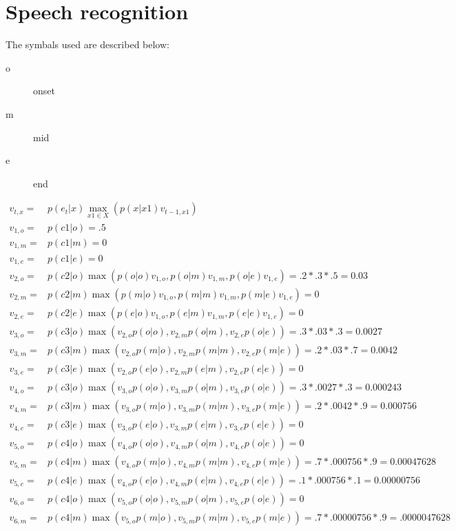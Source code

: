 \documentclass[12pt]{article}
\begin{document}
\section{Speech recognition}
The symbals used are described below:
\begin{description}
  \item[o] onset
  \item[m] mid
  \item[e] end
\end{description}
\begin{align*}
v_{t,x} =& p(e_t|x) \max_{x1 \in X} (p(x|x1) v_{t-1,x1})\\
v_{1,o} =& p(c1|o) = .5\\
v_{1,m} =& p(c1|m) = 0\\
v_{1,e} =& p(c1|e) = 0\\
v_{2,o} =& p(c2|o) \max(p(o|o) v_{1,o}, p(o|m) v_{1,m}, p(o|e) v_{1,e}) = .2*.3*.5 = 0.03\\
v_{2,m} =& p(c2|m) \max(p(m|o) v_{1,o}, p(m|m) v_{1,m}, p(m|e) v_{1,e}) = 0\\
v_{2,e} =& p(c2|e) \max(p(e|o) v_{1,o}, p(e|m) v_{1,m}, p(e|e) v_{1,e}) = 0\\
v_{3,o} =& p(c3|o) \max(v_{2,o} p(o|o), v_{2,m} p(o|m), v_{2,e} p(o|e)) = .3*.03*.3=0.0027\\
v_{3,m} =& p(c3|m) \max(v_{2,o} p(m|o), v_{2,m} p(m|m), v_{2,e} p(m|e)) = .2*.03*.7=0.0042\\
v_{3,e} =& p(c3|e) \max(v_{2,o} p(e|o), v_{2,m} p(e|m), v_{2,e} p(e|e)) = 0\\
v_{4,o} =& p(c3|o) \max(v_{3,o}p(o|o), v_{3,m}p(o|m), v_{3,e}p(o|e))=.3*.0027*.3=0.000243\\
v_{4,m} =& p(c3|m) \max(v_{3,o}p(m|o), v_{3,m}p(m|m), v_{3,e}p(m|e))=.2*.0042*.9=0.000756\\
v_{4,e} =& p(c3|e) \max(v_{3,o}p(e|o), v_{3,m}p(e|m), v_{3,e}p(e|e))=0\\
v_{5,o}=&p(c4|o)\max(v_{4,o}p(o|o),v_{4,m}p(o|m),v_{4,e}p(o|e))=0\\
v_{5,m}=&p(c4|m)\max(v_{4,o}p(m|o),v_{4,m}p(m|m),v_{4,e}p(m|e))=.7*.000756*.9=0.00047628\\
v_{5,e}=&p(c4|e)\max(v_{4,o}p(e|o),v_{4,m}p(e|m),v_{4,e}p(e|e))=.1*.000756*.1=0.00000756\\
v_{6,o}=&p(c4|o)\max(v_{5,o}p(o|o),v_{5,m}p(o|m),v_{5,e}p(o|e))=0\\
v_{6,m}=&p(c4|m)\max(v_{5,o}p(m|o),v_{5,m}p(m|m),v_{5,e}p(m|e))=.7*.00000756*.9=.0000047628\\

\end{align*}
\end{document}
